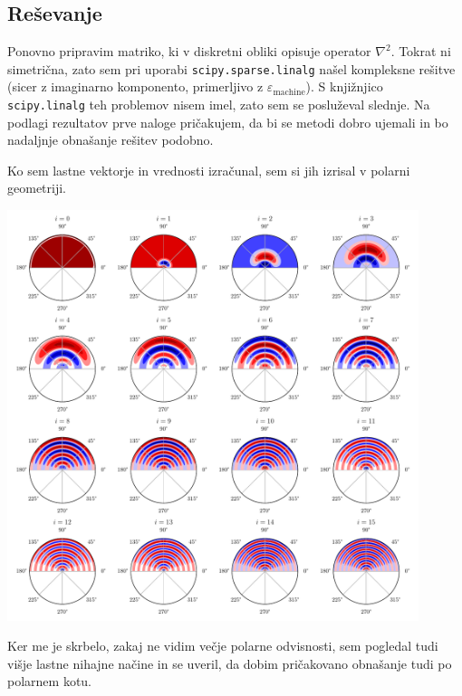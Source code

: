 
\subsection{Reševanje}

Ponovno pripravim matriko, ki v diskretni obliki opisuje operator $\nabla^2$. Tokrat ni simetrična, zato sem pri uporabi \texttt{scipy.sparse.linalg} našel kompleksne rešitve (sicer z imaginarno komponento, primerljivo z $\varepsilon_\text{machine}$). S knjižnjico \texttt{scipy.linalg} teh problemov nisem imel, zato sem se posluževal slednje. Na podlagi rezultatov prve naloge pričakujem, da bi se metodi dobro ujemali in bo nadaljnje obnašanje rešitev podobno.

Ko sem lastne vektorje in vrednosti izračunal, sem si jih izrisal v polarni geometriji.

\begin{center}
    \includegraphics[width=0.9\textwidth]{../old/2-nihajni_nacini.pdf}
\end{center}
Ker me je skrbelo, zakaj  ne vidim večje polarne odvisnosti, sem pogledal tudi višje lastne nihajne načine in se uveril, da dobim pričakovano obnašanje tudi po polarnem kotu.



